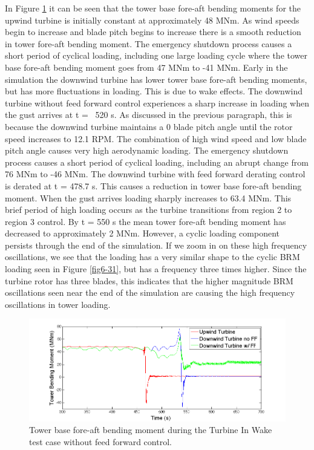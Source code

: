 In Figure \ref{fig6-32} it can be seen that the tower base fore-aft bending moments for the upwind turbine is initially constant at approximately 48 MNm. As wind speeds begin to increase and blade pitch begins to increase there is a smooth reduction in tower fore-aft bending moment. The emergency shutdown process causes a short period of cyclical loading, including one large loading cycle where the tower base fore-aft bending moment goes from 47 MNm to -41 MNm. Early in the simulation the downwind turbine has lower tower base fore-aft bending moments, but has more fluctuations in loading. This is due to wake effects. The downwind turbine without feed forward control experiences a sharp increase in loading when the gust arrives at t = ~520 s. As discussed in the previous paragraph, this is because the downwind turbine maintains a 0\degree{} blade pitch angle until the rotor speed increases to 12.1 RPM. The combination of high wind speed and low blade pitch angle causes very high aerodynamic loading. The emergency shutdown process causes a short period of cyclical loading, including an abrupt change from 76 MNm to -46 MNm. The downwind turbine with feed forward derating control is derated at t = 478.7 s. This causes a reduction in tower base fore-aft bending moment. When the gust arrives loading sharply increases to 63.4 MNm. This brief period of high loading occurs as the turbine transitions from region 2 to region 3 control. By t = 550 s the mean tower fore-aft bending moment has decreased to approximately 2 MNm. However, a cyclic loading component persists through the end of the simulation. If we zoom in on these high frequency oscillations, we see that the loading has a very similar shape to the cyclic BRM loading seen in Figure \ref{fig6-31}, but has a frequency three times higher. Since the turbine rotor has three blades, this indicates that the higher magnitude BRM oscillations seen near the end of the simulation are causing the high frequency oscillations in tower loading. 


\begin{figure}[ht] 
	\centering
		\includegraphics[width = \linewidth]{Figures/ch6Figures/fig6-32.png}

	\caption{Tower base fore-aft bending moment during the Turbine In Wake test case without feed forward control.}
	\label{fig6-32}
\end{figure}


